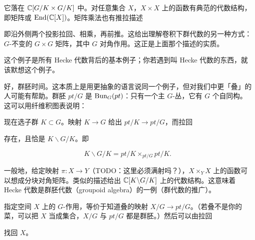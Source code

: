 它落在 $\mathbb{C}[G/K\times G/K]$ 中。对任意集合 $X$，$X\times X$ 上的函数有典范的代数结构，即矩阵或 $\operatorname{End}(\mathbb{C}[X])$。矩阵乘法也有推拉描述



即沿外侧两个投影拉回、相乘，再前推。这给出理解卷积下群代数的另一种方式：$G$-不变的 $G\times G$ 矩阵，其中 $G$ 对角作用。这正是上面那个描述的实质。

这个例子是所有 Hecke 代数背后的基本例子；你若遇到叫 Hecke 代数的东西，就该默想这个例子。

好，群胚时间。这本质上是用更抽象的语言说同一个例子，但对我们中更「叠」的人可能有帮助。群胚 $pt/G$ 是 $\mathrm{Bun}_G(pt)$：只有一个主 $G$-丛，它有 $G$ 个自同构。这可以用纤维积图表说明：


现在选子群 $K\subset G$。映射 $K\to G$ 给出 $pt/K\to pt/G$，而拉回


存在，且恰是 $K\backslash G/K$。即

\[K\backslash G/K=pt/K\times_{pt/G}pt/K.\]

一般地，给定映射 $\pi:X\to Y$（TODO：这里必须满射吗？），$X\times_Y X$ 上的函数可以想成分块对角矩阵。类似的描述给出 $\mathbb{C}[K\backslash G/K]$ 上的代数结构。这意味着 Hecke 代数是群胚代数（groupoid algebra）的一例（群代数的推广）。

指定空间 $X$ 上的 $G$-作用，等价于知道叠的映射 $X/G\to pt/G$。（若叠不是你的菜，可以把 $X$ 当成集合，$X/G$ 与 $pt/G$ 都是群胚。）然后可以由拉回


找回 $X$。

